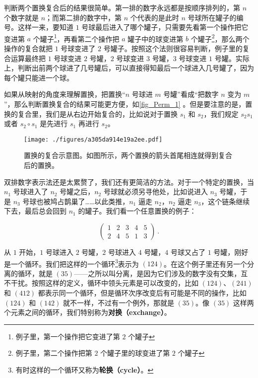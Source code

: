 判断两个置换复合后的结果很简单。第一排的数字永远都是按顺序排列的，第 $n$ 个数字就是 $n$；而第二排的数字中，第 $n$ 个代表的是此时 $n$ 号球所在罐子的编号。这样一来，要知道 $1$ 号球最后进入了哪个罐子，只需要先看第一个操作把它变进第 $a$ 个罐子\footnote{例子里，第一个操作把它变进了第 $2$ 个罐子}，再看第二个操作把 $a$ 罐子中的球变进第 $b$ 个罐子\footnote{例子里，第二个操作把第 $2$ 个罐子里的球变进了第 $2$ 个罐子}，那么两个操作的复合就把 $1$ 号球变进了 $2$ 号罐子。按照这个法则很容易判断，例子里的复合运算最终把 $1$ 号球变进 $2$ 号罐，$2$ 号球变进 $3$ 号罐，$3$ 号球变进 $1$ 号罐。实际上，判断出前两个球进了几号罐后，可以直接得知最后一个球进入几号罐了，因为每个罐只能进一个球。

如果从映射的角度来理解置换，把置换“$n$ 号球进 $m$ 号罐”看成“把数字 $n$ 变为 $m$”，那么判断置换复合的结果可能更方便，如\autoref{fig_Perm_1} 。但是要注意的是，置换的复合里，我们是从右边开始复合的，比如说对于置换 $s_1$ 和 $s_2$，我们规定 $s_2 s_1$ 或者 $s_2 \circ s_1$ 是先进行 $s_1$ 再进行 $s_2$。


\begin{figure}[ht]
\centering
\texttt{[image: ./figures/a305da914e19a2ee.pdf]}
\caption{置换的复合示意图。如图所示，两个置换的箭头首尾相连就得到复合后的置换。} \label{fig_Perm_1}
\end{figure}


双排数字表示法还是太累赘了，我们还有更简洁的方法。对于一个特定的置换，当 $n_1$ 号球进入了 $n_2$ 号罐之后，$n_2$ 号球就必须另寻他处，比如说进入 $n_3$ 号罐，于是 $n_3$ 号球也被鸠占鹊巢了……以此类推，$n_1$ 逼走 $n_2$，$n_2$ 逼走 $n_3$，这个链条继续下去，最后总会回到 $n_1$ 的罐子。我们看一个任意置换的例子：

\begin{equation}\label{eq_Perm_1}\begin{pmatrix}
1&2&3&4&5\\2&4&5&1&3
\end{pmatrix}~.\end{equation}

从 $1$ 开始，$1$ 号球进入 $2$ 号罐，$2$ 号球进入 $4$ 号罐，$4$ 号球又占了 $1$ 号罐，刚好是一个循环。我们把这样的一个循环\footnote{有时这样的一个循环又称为\textbf{轮换（cycle）}。}表示为 $(1 2 4)$。在这个例子里还有另一个分离的循环，就是 $(3 5)$——之所以叫分离，是因为它们涉及的数字没有交集，互不干扰。按照这样的定义，循环中领头元素是可以改变的，比如 $(1 2 4)$、$(2 4 1)$ 和 $(4 1 2)$ 都表示同一个循环，但是循环次序改变后有可能是不同的操作，比如 $(1 2 4)$ 和 $(1 4 2)$ 就不一样，不过有一个例外，那就是 $(3 5)$。像 $(3 5)$ 这样两个元素之间的循环，我们特别称为\textbf{对换（exchange）}。

